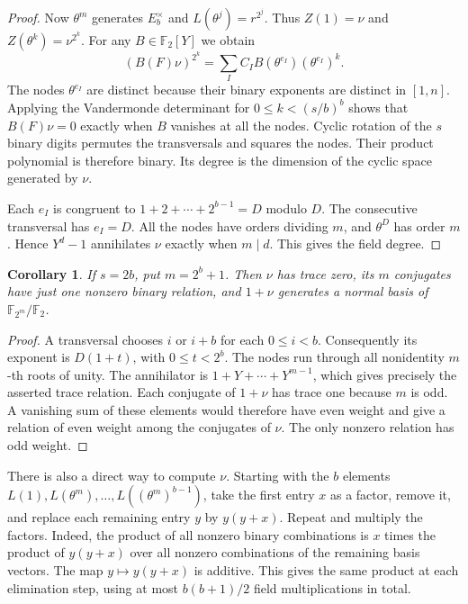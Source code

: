 \documentclass[11pt]{article}
\newtheorem{corollary}[theorem]{Corollary}
\newcommand{\F}{\mathbb F_2}
\begin{document}
\begin{proof}
Now \(\theta^m\) generates \(E_b^\times\) and \(L(\theta^j)=r^{2^j}\).
Thus \(Z(1)=\nu\) and \(Z(\theta^k)=\nu^{2^k}\). For any
\(B\in\F[Y]\) we obtain
\[
 (B(F)\nu)^{2^k}=\sum_I C_I B(\theta^{e_I})(\theta^{e_I})^k .
\]
The nodes \(\theta^{e_I}\) are distinct because their binary
exponents are distinct in \([1,n]\). Applying the Vandermonde
determinant for \(0\le k< (s/b)^b\) shows that \(B(F)\nu=0\) exactly
when \(B\) vanishes at all the nodes. Cyclic rotation of the \(s\)
binary digits permutes the transversals and squares the nodes.
Their product polynomial is therefore binary. Its degree is the
dimension of the cyclic space generated by \(\nu\).

Each \(e_I\) is congruent to \(1+2+\cdots+2^{b-1}=D\) modulo \(D\).
The consecutive transversal has \(e_I=D\). All the nodes have orders
dividing \(m\), and \(\theta^D\) has order \(m\). Hence \(Y^d-1\)
annihilates \(\nu\) exactly when \(m\mid d\). This gives the field degree.
\end{proof}

\begin{corollary}
If \(s=2b\), put \(m=2^b+1\). Then \(\nu\) has trace zero, its
\(m\) conjugates have just one nonzero binary relation, and
\(1+\nu\) generates a normal basis of \(\mathbb F_{2^m}/\F\).
\end{corollary}
\begin{proof}
A transversal chooses \(i\) or \(i+b\) for each \(0\le i<b\).
Consequently its exponent is \(D(1+t)\), with \(0\le t<2^b\).
The nodes run through all nonidentity \(m\)-th roots of unity.
The annihilator is \(1+Y+\cdots+Y^{m-1}\), which gives precisely
the asserted trace relation. Each conjugate of \(1+\nu\) has trace
one because \(m\) is odd. A vanishing sum of these elements would
therefore have even weight and give a relation of even weight among
the conjugates of \(\nu\). The only nonzero relation has odd weight.
\end{proof}

There is also a direct way to compute \(\nu\). Starting with the
\(b\) elements \(L(1),L(\theta^m),\ldots,L((\theta^m)^{b-1})\),
take the first entry \(x\) as a factor, remove it, and replace each
remaining entry \(y\) by \(y(y+x)\). Repeat and multiply the factors.
Indeed, the product of all nonzero binary combinations is \(x\) times
the product of \(y(y+x)\) over all nonzero combinations of the remaining
basis vectors. The map \(y\mapsto y(y+x)\) is additive. This gives the
same product at each elimination step, using at most \(b(b+1)/2\)
field multiplications in total.
\end{document}

